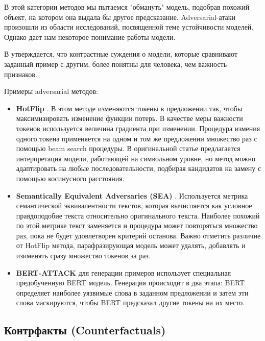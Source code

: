 В этой категории методов мы пытаемся "обмануть" модель, подобрав похожий объект, на котором она выдала бы другое предсказание. Adversarial-атаки произошли из области исследований, посвященной теме устойчивости моделей. Однако дает нам некоторое понимание работы модели.

В \cite{millerExplanationArtificialIntelligence2019} утверждается, что контрастные суждения о модели, которые сравнивают заданный пример с другим, более понятны для человека, чем важность признаков.

Примеры adversarial методов:
\begin{itemize}
    \item \textbf{HotFlip} \cite{ebrahimiHotFlipWhiteBoxAdversarial2018}. В этом методе изменяются токены в предложении так, чтобы максимизировать изменение функции потерь. В качестве меры важности токенов используется величина градиента при изменении. Процедура измения одного токена применяется на одном и том же предложении множество раз с помощью beam search процедуры. В оригинальной статье предлагается интерпретация модели, работающей на символьном уровне, но метод можно адаптировать на любые последовательности, подбирая кандидатов на замену с помощью косинусного расстояния.
    \item \textbf{Semantically Equivalent Adversaries (SEA)} \cite{ribeiroSemanticallyEquivalentAdversarial2018}. Используется метрика семантической эквивалентности текстов, которая вычисляется как условное правдоподобие текста относительно оригинального текста. Наиболее похожий по этой метрике текст заменяется и процедура может повторяться множество раз, пока не будет удовлетворен критерий останова. Важно отметить различие от HotFlip метода, парафразирующая модель может удалять, добавлять и изименять сразу множество токенов за раз.
    \item \textbf{BERT-ATTACK} \cite{liBERTATTACKAdversarialAttack2020} для генерации примеров использует специальная предобученную BERT модель. Генерация происходит в два этапа: BERT определяет наиболее уязвимые слова в заданном предложении и затем эти слова маскируются, чтобы BERT предсказал другие токены на их место. %
\end{itemize}

\vspace{8mm}
\subsection{Контрфакты (Counterfactuals)}

